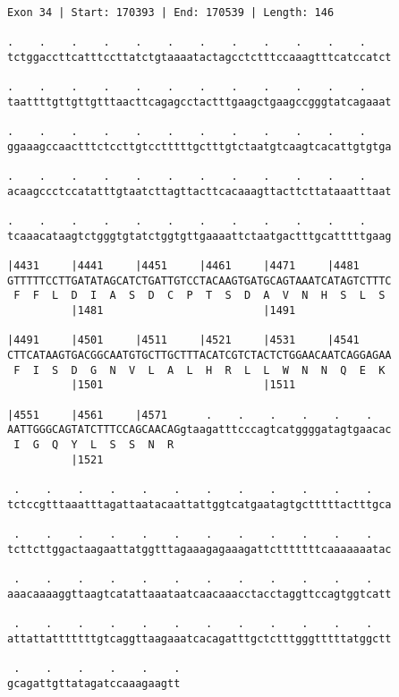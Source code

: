 \documentclass{article}
\begin{document}
\begin{Verbatim}[fontfamily=courier]
Exon 34 | Start: 170393 | End: 170539 | Length: 146

.    .    .    .    .    .    .    .    .    .    .    .    
tctggaccttcatttccttatctgtaaaatactagcctctttccaaagtttcatccatct

.    .    .    .    .    .    .    .    .    .    .    .    
taattttgttgttgtttaacttcagagcctactttgaagctgaagccgggtatcagaaat

.    .    .    .    .    .    .    .    .    .    .    .    
ggaaagccaactttctccttgtcctttttgctttgtctaatgtcaagtcacattgtgtga

.    .    .    .    .    .    .    .    .    .    .    .    
acaagccctccatatttgtaatcttagttacttcacaaagttacttcttataaatttaat

.    .    .    .    .    .    .    .    .    .    .    .    
tcaaacataagtctgggtgtatctggtgttgaaaattctaatgactttgcatttttgaag

|4431     |4441     |4451     |4461     |4471     |4481     
GTTTTTCCTTGATATAGCATCTGATTGTCCTACAAGTGATGCAGTAAATCATAGTCTTTC
 F  F  L  D  I  A  S  D  C  P  T  S  D  A  V  N  H  S  L  S 
          |1481                         |1491               

|4491     |4501     |4511     |4521     |4531     |4541     
CTTCATAAGTGACGGCAATGTGCTTGCTTTACATCGTCTACTCTGGAACAATCAGGAGAA
 F  I  S  D  G  N  V  L  A  L  H  R  L  L  W  N  N  Q  E  K 
          |1501                         |1511               

|4551     |4561     |4571      .    .    .    .    .    .   
AATTGGGCAGTATCTTTCCAGCAACAGgtaagatttcccagtcatggggatagtgaacac
 I  G  Q  Y  L  S  S  N  R                                  
          |1521                                             

 .    .    .    .    .    .    .    .    .    .    .    .   
tctccgtttaaatttagattaatacaattattggtcatgaatagtgctttttactttgca

 .    .    .    .    .    .    .    .    .    .    .    .   
tcttcttggactaagaattatggtttagaaagagaaagattctttttttcaaaaaaatac

 .    .    .    .    .    .    .    .    .    .    .    .   
aaacaaaaggttaagtcatattaaataatcaacaaacctacctaggttccagtggtcatt

 .    .    .    .    .    .    .    .    .    .    .    .   
attattatttttttgtcaggttaagaaatcacagatttgctctttgggtttttatggctt

 .    .    .    .    .    .
gcagattgttatagatccaaagaagtt
\end{Verbatim}
\end{document}

